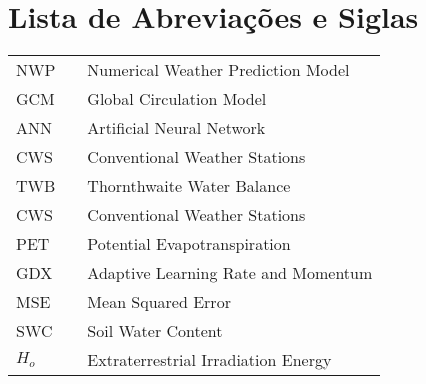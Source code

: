 \chapter*{Lista de Abreviações e Siglas}

\vspace*{-0.5cm}

\onehalfspacing


\noindent
\begin{tabular}{l c p{.85\linewidth}}
NWP                & & Numerical Weather Prediction Model\\

GCM                & & Global Circulation Model\\

ANN                & & Artificial Neural Network\\

CWS                & & Conventional Weather Stations\\

TWB                & & Thornthwaite  Water Balance\\

CWS                & & Conventional Weather Stations\\

PET                & & Potential Evapotranspiration\\

GDX                & & Adaptive Learning Rate and Momentum\\

MSE                & & Mean Squared Error\\ 

SWC                & & Soil Water Content\\ 

$H_o$              & & Extraterrestrial Irradiation Energy\\


\end{tabular}

%
 
